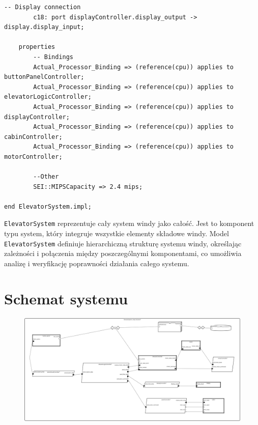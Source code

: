 \documentclass{article}
\begin{document}
\begin{lstlisting}[basicstyle=\ttfamily, keywordstyle=\bfseries]
        -- Display connection
        c18: port displayController.display_output -> display.display_input;
        
    properties
        -- Bindings
        Actual_Processor_Binding => (reference(cpu)) applies to buttonPanelController;
        Actual_Processor_Binding => (reference(cpu)) applies to elevatorLogicController;
        Actual_Processor_Binding => (reference(cpu)) applies to displayController;
        Actual_Processor_Binding => (reference(cpu)) applies to cabinController;
        Actual_Processor_Binding => (reference(cpu)) applies to motorController;

        --Other
    	SEI::MIPSCapacity => 2.4 mips;
        
end ElevatorSystem.impl;
    \end{lstlisting}

    \texttt{ElevatorSystem} reprezentuje cały system windy jako całość. Jest to komponent typu system, który integruje wszystkie elementy składowe windy. Model \texttt{ElevatorSystem} definiuje hierarchiczną strukturę systemu windy, określając zależności i połączenia między poszczególnymi komponentami, co umożliwia analizę i weryfikację poprawności działania całego systemu.



\section{Schemat systemu}


\begin{figure}[H]
    \centering
    \includegraphics[width=1.2\linewidth]{./images/schema.png}
\end{figure}
\end{document}
